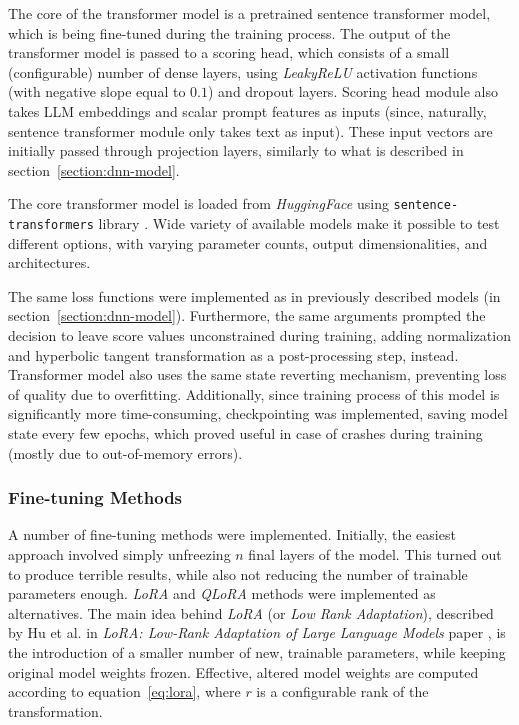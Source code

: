 \documentclass[a4paper,11pt,twoside]{report}
\theoremstyle{definition}
\begin{document}
The core of the transformer model is a pretrained sentence transformer model, which is being fine-tuned during the training process. The output of the transformer model is passed to a scoring head, which consists of a small (configurable) number of dense layers, using \textit{LeakyReLU} activation functions (with negative slope equal to $0.1$) and dropout layers. Scoring head module also takes LLM embeddings and scalar prompt features as inputs (since, naturally, sentence transformer module only takes text as input). These input vectors are initially passed through projection layers, similarly to what is described in section~\ref{section:dnn-model}.

The core transformer model is loaded from \textit{HuggingFace} \cite{wolf2020huggingface} using \texttt{sentence-transformers} library \cite{reimers2019sentencetransformers}. Wide variety of available models make it possible to test different options, with varying parameter counts, output dimensionalities, and architectures.

The same loss functions were implemented as in previously described models (in section~\ref{section:dnn-model}). Furthermore, the same arguments prompted the decision to leave score values unconstrained during training, adding normalization and hyperbolic tangent transformation as a post-processing step, instead. Transformer model also uses the same state reverting mechanism, preventing loss of quality due to overfitting. Additionally, since training process of this model is significantly more time-consuming, checkpointing was implemented, saving model state every few epochs, which proved useful in case of crashes during training (mostly due to out-of-memory errors).

\subsubsection{Fine-tuning Methods}
\label{section:transformer-embedding-fine-tuning}

A number of fine-tuning methods were implemented. Initially, the easiest approach involved simply unfreezing $n$ final layers of the model. This turned out to produce terrible results, while also not reducing the number of trainable parameters enough. \textit{LoRA} and \textit{QLoRA} methods were implemented as alternatives. The main idea behind \textit{LoRA} (or \textit{Low Rank Adaptation}), described by Hu et al. in \textit{LoRA: Low-Rank Adaptation of Large Language Models} paper \cite{hu2022lora}, is the introduction of a smaller number of new, trainable parameters, while keeping original model weights frozen. Effective, altered model weights are computed according to equation~\ref{eq:lora}, where $r$ is a configurable rank of the transformation.
\end{document}
